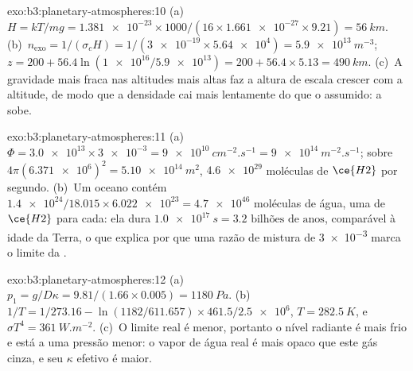 \begin{solution}{exo:b3:planetary-atmospheres:10}
(a)~$H = kT/mg = \num{1.381e-23}\times1000/(16\times\num{1.661e-27}\times9.21)
= \qty{56}{km}$. (b)~$n_\mathrm{exo} = 1/(\sigma_c H) = 1/(\num{3e-19}\times
\num{5.64e4}) = \qty{5.9e13}{m^{-3}}$; $z = 200 + 56.4\ln(\num{1e16}/
\num{5.9e13}) = 200 + 56.4\times5.13 = \qty{490}{km}$. (c)~A gravidade mais fraca
nas altitudes mais altas faz a altura de escala crescer com a altitude, de modo que a densidade cai
mais lentamente do que o assumido: a  sobe.
\end{solution}

\begin{solution}{exo:b3:planetary-atmospheres:11}
(a)~$\Phi = \num{3.0e13}\times\num{3e-3} = \qty{9e10}{cm^{-2}.s^{-1}} =
\qty{9e14}{m^{-2}.s^{-1}}$; sobre $4\pi(\num{6.371e6})^2 =
\qty{5.10e14}{m^2}$, $\num{4.6e29}$ moléculas de $\ce{H2}$ por segundo.
(b)~Um oceano contém $\num{1.4e24}/18.015\times\num{6.022e23} =
\num{4.7e46}$ moléculas de água, uma de $\ce{H2}$ para cada: ela dura
$\qty{1.0e17}{s} = \num{3.2}\text{ bilhões de anos}$, comparável à idade da
Terra, o que explica por que uma razão de mistura de \num{3e-3} marca o limite da
.
\end{solution}

\begin{solution}{exo:b3:planetary-atmospheres:12}
(a)~$p_1 = g/D\kappa = 9.81/(1.66\times0.005) = \qty{1180}{Pa}$.
(b)~$1/T = 1/273.16 - \ln(1182/611.657)\times461.5/\num{2.5e6}$, $T =
\qty{282.5}{K}$, e $\sigma T^4 = \qty{361}{W.m^{-2}}$. (c)~O limite real
é menor, portanto o nível radiante é mais frio e está a uma pressão menor: o vapor de água real
é mais opaco que este gás cinza, e seu $\kappa$ efetivo
é maior.
\end{solution}

